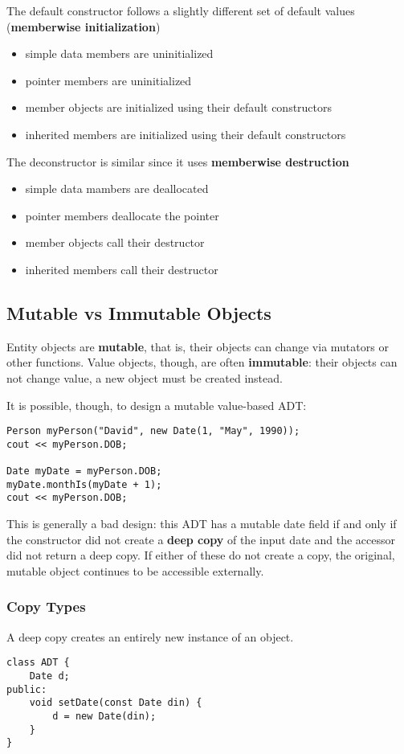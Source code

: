 \documentclass[12pt]{article}
\begin{document}
The default constructor follows a slightly different set of default values ({\bf memberwise initialization})
\begin{itemize}
\item simple data members are uninitialized
\item pointer members are uninitialized
\item member objects are initialized using their default constructors
\item inherited members are initialized using their default constructors
\end{itemize}

The deconstructor is similar since it uses {\bf memberwise destruction}
\begin{itemize}
\item simple data mambers are deallocated
\item pointer members deallocate the pointer
\item member objects call their destructor
\item inherited members call their destructor
\end{itemize}

\subsection{Mutable vs Immutable Objects}
Entity objects are {\bf mutable}, that is, their objects can change via mutators or other functions. Value objects, though, are often {\bf immutable}: their objects can not change value, a new object must be created instead.

It is possible, though, to design a mutable value-based ADT:\@
\begin{verbatim}
Person myPerson("David", new Date(1, "May", 1990));
cout << myPerson.DOB;

Date myDate = myPerson.DOB;
myDate.monthIs(myDate + 1);
cout << myPerson.DOB;
\end{verbatim}
This is generally a bad design: this ADT has a mutable date field if and only if the constructor did not create a {\bf deep copy} of the input date and the accessor did not return a deep copy. If either of these do not create a copy, the original, mutable object continues to be accessible externally.

\subsubsection{Copy Types}
A deep copy creates an entirely new instance of an object.
\begin{verbatim}
class ADT {
    Date d;
public:
    void setDate(const Date din) {
        d = new Date(din);
    }
}
\end{verbatim}
\end{document}
